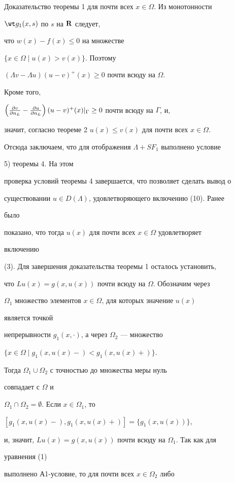 \begin{pf*}{Доказательство теоремы 1}
для почти всех $x\in\Omega$. Из монотонности 


$\wt g_1(x,s)$ по $s$ на $\bold R$ следует, 


что $w(x)-f(x)\le 0$ на множестве 


$\{x\in\Omega\mid u(x)>v(x)\}$. Поэтому 


$(\Lambda v-\Lambda u)(u-v)^+(x)\ge 0$ почти всюду на $\Omega$. 


Кроме того, 


$\left(\myfrac{v}{n_L}-\myfrac{u}{n_L}\right) 


(u-v)^+(x)|_\Gamma\ge 0$ почти всюду на $\Gamma$, и, 


значит, согласно теореме 2\; $u(x)\le v(x)$ для почти всех $x\in\Omega$.


Отсюда заключаем, что для отображения $\Lambda+SF_1$ выполнено условие 


5) теоремы 4. На этом 


проверка условий теоремы 4 завершается, что позволяет сделать вывод о 


существовании $u\in D(\Lambda)$, удовлетворяющего включению (10). Ранее 


было 


показано, что тогда $u(x)$ для почти всех $x\in\Omega$ удовлетворяет 


включению 


(3). Для завершения доказательства теоремы 1 осталось установить, 


что $Lu(x)=g(x,u(x))$ почти всюду на $\Omega$. Обозначим через 


$\Omega_1$ множество элементов $x\in\Omega$, для которых значение $u(x)$ 


является точкой 


непрерывности $g_1(x,\cdot)$, а через $\Omega_2$ --- множество 


$\{x\in\Omega\mid g_1(x,u(x)-)<g_1(x,u(x)+)\}$. 


Тогда $\Omega_1\cup\Omega_2$ с точностью до множества меры нуль 


совпадает с $\Omega$ и 


$\Omega_1\cap\Omega_2=\emptyset$. Если $x\in\Omega_1$, то 


$[g_1(x,u(x)-),g_1(x,u(x)+)]=\{g_1(x,u(x))\}$, 


и, значит, $Lu(x)=g(x,u(x))$ почти всюду на $\Omega_1$. Так как для 


уравнения (1) 


выполнено А1-условие, то для почти всех $x\in\Omega_2$ либо 



\end{pf*}
